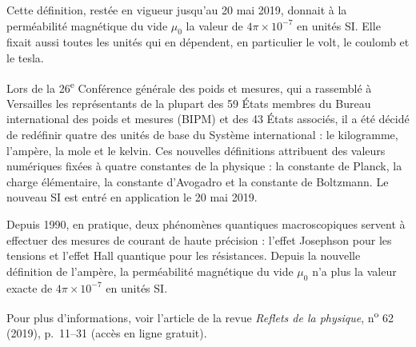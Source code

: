 \documentclass[11pt,a4paper]{article}
\begin{document}
Cette définition, restée en vigueur jusqu'au 20 mai 2019, donnait à la perméabilité magnétique
du vide \(\mu_0\) la valeur de \(4\pi\times10^{-7}\) en unités SI. Elle fixait aussi toutes
les unités qui en dépendent, en particulier le volt, le coulomb et le tesla.

Lors de la 26\textsuperscript{e} Conférence générale des poids et mesures, qui a rassemblé
à Versailles les représentants de la plupart des 59 États membres du Bureau international des
poids et mesures (BIPM) et des 43 États associés, il a été décidé de redéfinir quatre des unités
de base du Système international : le kilogramme, l'ampère, la mole et le kelvin. Ces nouvelles
définitions attribuent des valeurs numériques fixées à quatre constantes de la physique :
la constante de Planck, la charge élémentaire, la constante d'Avogadro et la constante de
Boltzmann. Le nouveau SI est entré en application le 20 mai 2019.

Depuis 1990, en pratique, deux phénomènes quantiques macroscopiques servent à effectuer des
mesures de courant de haute précision : l'effet Josephson pour les tensions et l'effet Hall
quantique pour les résistances. Depuis la nouvelle définition de l'ampère, la perméabilité
magnétique du vide \(\mu_0\) n'a plus la valeur exacte de \(4\pi\times10^{-7}\) en unités SI.

Pour plus d'informations, voir l'article de la revue \emph{Reflets de la physique},
n\textsuperscript{o} 62 (2019), p.~11--31 (accès en ligne gratuit).
\end{document}
